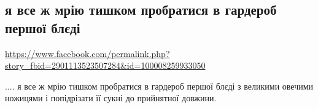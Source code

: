  
 
 
 
 
\subsection{я все ж мрію тишком пробратися в гардероб першої блєді}
\label{sec:16_04_2021.fb.makarenko_oksana.2.mechta_pervaja_bledi}
\url{https://www.facebook.com/permalink.php?story_fbid=2901113523507284&id=100008259933050}

.... я все ж мрію тишком пробратися в гардероб першої блєді з великими овечими
ножицями і попідрізати її сукні до прийнятної довжини.
